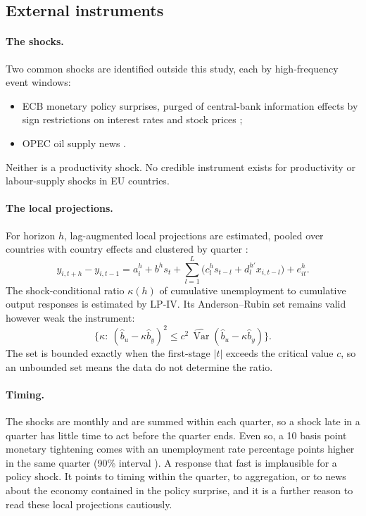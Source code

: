 \subsection{External instruments}

\paragraph{The shocks.} Two common shocks are identified outside this study, each by
high-frequency event windows:
\begin{itemize}
  \item ECB monetary policy surprises, purged of central-bank information effects by sign
    restrictions on interest rates and stock prices
    \citep{jarocinski2020information,altavilla2019mpd};
  \item OPEC oil supply news \citep{kanzig2021oil}.
\end{itemize}
Neither is a productivity shock. No credible instrument exists for productivity or
labour-supply shocks in EU countries.

\paragraph{The local projections.} For horizon $h$, lag-augmented local projections are
estimated, pooled over countries with country effects and clustered by quarter
\citep{montielolea2021lp}:
\[
  y_{i,t+h}-y_{i,t-1}=a_i^h+b^h s_t+\sum_{l=1}^{L}\big(c_l^h s_{t-l}+d_l^{h\prime} x_{i,t-l}\big)
  +e_{it}^h .
\]
The shock-conditional ratio $\kappa(h)$ of cumulative unemployment to cumulative output
responses is estimated by LP-IV. Its Anderson--Rubin set
\citep{anderson1949ar} remains valid however weak the instrument:
\[
  \Big\{\kappa:\ (\hat b_u-\kappa\hat b_y)^2\le c^2\,\widehat{\operatorname{Var}}
  (\hat b_u-\kappa\hat b_y)\Big\}.
\]
The set is bounded exactly when the first-stage $|t|$ exceeds the critical value $c$, so an
unbounded set means the data do not determine the ratio.

\paragraph{Timing.} The shocks are monthly and are summed within each quarter, so a shock
late in a quarter has little time to act before the quarter ends. Even so, a 10 basis
point monetary tightening comes with an unemployment rate  percentage points
higher in the same quarter (90\% interval ). A response that fast is
implausible for a policy shock. It points to timing within the quarter, to aggregation, or
to news about the economy contained in the policy surprise, and it is a further reason to
read these local projections cautiously.

